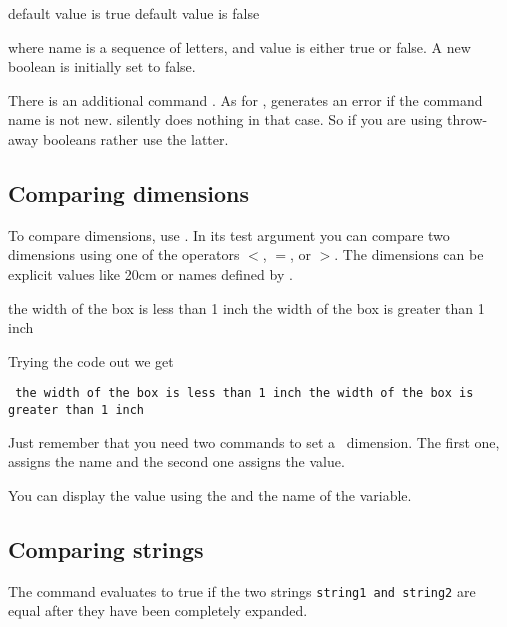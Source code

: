 \begin{teX}

\ifthenelse{\isOdd}
  {default value is true}
  {default value is false}
\end{teX}

where name is a sequence of letters, and value is either true or
false. A new boolean is initially set to false.

There is an additional command .  As for ,  generates
an error if the command name is not new.  silently does nothing
in that case. So if you are using throw-away booleans rather use the latter.

\subsection{Comparing dimensions}

To compare dimensions, use . In its test argument you
can compare two dimensions using one of the operators $<$, $=$, or
$>$. The dimensions can be explicit values like 20cm or names
defined by .

\begin{teX}
\newlength\boxwidth
\setlength{\boxwidth}{10cm}
\ifthenelse{\lengthtest{\boxwidth<2.54cm}}
  {the width of the box is less than 1 inch}  
  {the width of the box is greater than 1 inch}  
\end{teX}

Trying the code out we get

{\tt
\newlength{\boxwidth}
\setlength{\boxwidth}{10cm}
\ifthenelse{\lengthtest{\boxwidth<1in}}
  {the width of the box is less than 1 inch}  
  {the width of the box is greater than 1 inch}  
\the\boxwidth
}

Just remember that you need two commands to set a \latex\ dimension. The first one,
 assigns the name and the second one  assigns the value.

You can display the value using the  and the name of the variable. 

\subsection{Comparing strings}
The  command evaluates to true if the two strings {\tt string1
and string2} are equal after they have been completely expanded.

